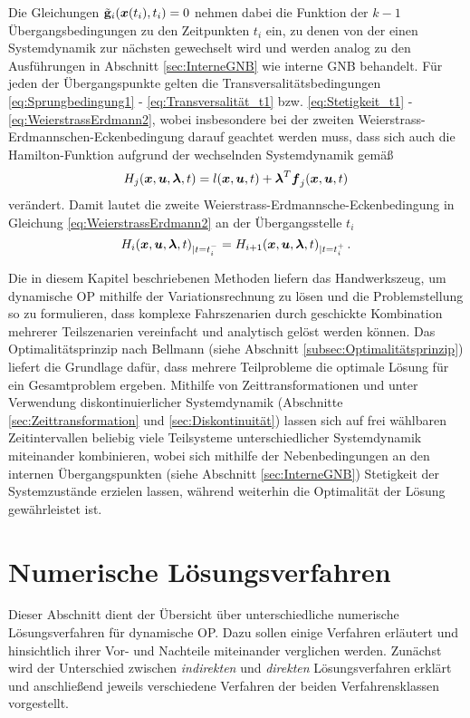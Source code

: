 Die Gleichungen $\tilde{\mathbf{g}}_i(\boldsymbol{x}(t_i),t_i) = 0$ nehmen dabei die Funktion der $k-1$ Übergangsbedingungen zu den Zeitpunkten $t_i$ ein, zu denen von der einen Systemdynamik zur nächsten gewechselt wird und werden analog zu den Ausführungen in Abschnitt \ref{sec:InterneGNB} wie interne \gls{GNB} behandelt. Für jeden der Übergangspunkte gelten die Transversalitätsbedingungen \eqref{eq:Sprungbedingung1} - \eqref{eq:Transversalität_t1} bzw. \eqref{eq:Stetigkeit_t1} - \eqref{eq:WeierstrassErdmann2}, wobei insbesondere bei der zweiten Weierstrass-Erdmannschen-Eckenbedingung darauf geachtet werden muss, dass sich auch die Hamilton-Funktion aufgrund der wechselnden Systemdynamik gemäß
\begin{equation}
	H_j(\boldsymbol{x},\boldsymbol{u},\boldsymbol{\lambda},t) = l(\boldsymbol{x},\boldsymbol{u},t) + \boldsymbol{\lambda}^T\boldsymbol{f}_j(\boldsymbol{x},\boldsymbol{u},t) \label{eq:Hamilton_j}
\end{equation} 
verändert. Damit lautet die zweite Weierstrass-Erdmannsche-Eckenbedingung in Gleichung \eqref{eq:WeierstrassErdmann2} an der Übergangsstelle $t_i$
\begin{equation}
H_i(\boldsymbol{x},\boldsymbol{u},\boldsymbol{\lambda},t)_{|t=t_i^-} = H_{i+1}(\boldsymbol{x},\boldsymbol{u},\boldsymbol{\lambda},t)_{|t=t_i^+}\,. \label{eq:WeierstrassErdmann2_j}
\end{equation}

Die in diesem Kapitel beschriebenen Methoden liefern das Handwerkszeug, um dynamische \gls{OP} mithilfe der Variationsrechnung zu lösen und die Problemstellung so zu formulieren, dass komplexe Fahrszenarien durch geschickte Kombination mehrerer Teilszenarien vereinfacht und analytisch gelöst werden können. Das Optimalitätsprinzip nach Bellmann (siehe Abschnitt \ref{subsec:Optimalitätsprinzip}) liefert die Grundlage dafür, dass mehrere Teilprobleme die optimale Lösung für ein Gesamtproblem ergeben. Mithilfe von Zeittransformationen und unter Verwendung diskontinuierlicher Systemdynamik (Abschnitte \ref{sec:Zeittransformation} und \ref{sec:Diskontinuität}) lassen sich auf frei wählbaren Zeitintervallen beliebig viele Teilsysteme unterschiedlicher Systemdynamik miteinander kombinieren, wobei sich mithilfe der Nebenbedingungen an den internen Übergangspunkten (siehe Abschnitt \ref{sec:InterneGNB}) Stetigkeit der Systemzustände erzielen lassen, während weiterhin die Optimalität der Lösung gewährleistet ist.
\section{Numerische Lösungsverfahren}\label{sec:Lösungsverfahren}
Dieser Abschnitt dient der Übersicht über unterschiedliche numerische Lösungsverfahren für dynamische \gls{OP}. Dazu sollen einige Verfahren erläutert und hinsichtlich ihrer Vor- und Nachteile miteinander verglichen werden. Zunächst wird der Unterschied zwischen \textit{indirekten} und \textit{direkten} Lösungsverfahren erklärt und anschließend jeweils verschiedene Verfahren der beiden Verfahrensklassen vorgestellt.
